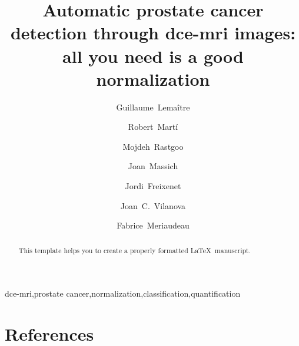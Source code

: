 \documentclass[review]{elsarticle}
\begin{document}
\begin{frontmatter}

\title{Automatic prostate cancer detection through \acs*{dce}-\acs*{mri} images: all you need is a good normalization}

\author[label1,label3]{Guillaume~Lema\^itre}
\author[label3]{Robert~Mart\'i}
\author[label1]{Mojdeh~Rastgoo}
\author[label1]{Joan~Massich}
\author[label3]{Jordi~Freixenet}
\author[label4]{Joan~C.~Vilanova}
\author[label1,label6]{Fabrice~Meriaudeau}
\address[label1]{\scriptsize LE2I UMR6306, CNRS, Arts et M\'etiers, Univ. Bourgogne Franche-Comt\'e, 12 rue de la Fonderie, 71200 Le Creusot, France}
\address[label3]{\scriptsize ViCOROB, Universitat de Girona, Campus Montilivi, Edifici P4, 17071 Girona, Spain}
\address[label4]{\scriptsize Department of Magnetic Resonance, Cl\'inica Girona, Lorenzana 36, 17002 Girona, Spain}
\address[label6]{\scriptsize CISIR, Electrical \& Electronic Engineering Department, Universiti Teknologi Petronas, 32610 Seri Iskandar, Perak, Malaysia}

\begin{abstract}
This template helps you to create a properly formatted \LaTeX\ manuscript.
\end{abstract}

\begin{keyword}
\acs*{dce}-\acs*{mri}\sep prostate cancer\sep normalization\sep classification\sep quantification
\end{keyword}

\end{frontmatter}

\acresetall
\linenumbers







\section*{References}


\end{document}
